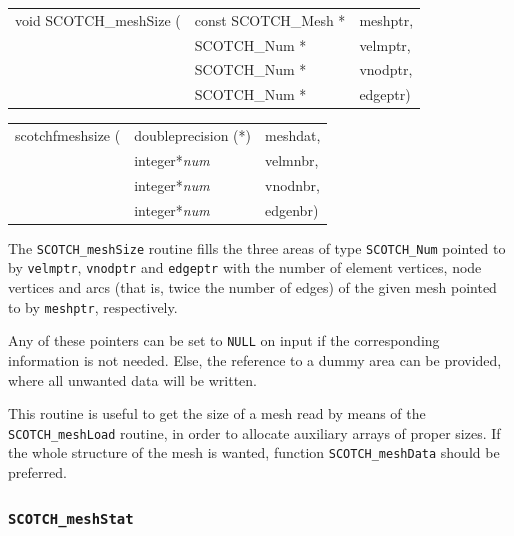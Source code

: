 \begin{itemize}
\progsyn

{\tt\begin{tabular}{l@{}ll}
void SCOTCH\_meshSize ( & const SCOTCH\_Mesh * & meshptr, \\
                        & SCOTCH\_Num *        & velmptr, \\
                        & SCOTCH\_Num *        & vnodptr, \\
                        & SCOTCH\_Num *        & edgeptr)
\end{tabular}}

{\tt\begin{tabular}{l@{}ll}
scotchfmeshsize ( & doubleprecision (*) & meshdat, \\
                  & integer*{\it num}   & velmnbr, \\
                  & integer*{\it num}   & vnodnbr, \\
                  & integer*{\it num}   & edgenbr)
\end{tabular}}

\progdes

The {\tt SCOTCH\_meshSize} routine fills the three areas of type
{\tt SCOTCH\_\lbt Num} pointed to by {\tt velmptr}, {\tt vnodptr}
and {\tt edgeptr} with the number of element vertices, node
vertices and arcs (that is, twice the number of edges) of the
given mesh pointed to by {\tt meshptr}, respectively.

Any of these pointers can be set to {\tt NULL} on input if the
corresponding information is not needed. Else, the reference to a
dummy area can be provided, where all unwanted data will be written.

This routine is useful to get the size of a mesh read by means
of the {\tt SCOTCH\_\lbt mesh\lbo Load} routine, in order to allocate
auxiliary arrays of proper sizes. If the whole structure of the
mesh is wanted, function {\tt SCOTCH\_mesh\lbo Data} should be
preferred.
\end{itemize}

\subsubsection{{\tt SCOTCH\_meshStat}}

